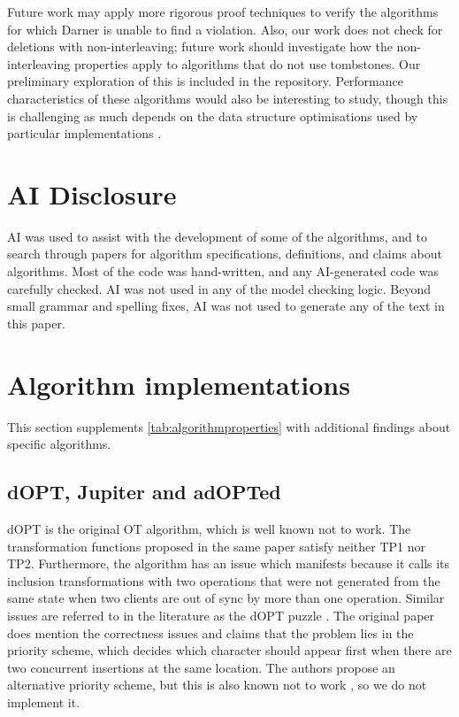 \documentclass[sigplan,10pt,review,anonymous]{acmart}
\begin{document}
Future work may apply more rigorous proof techniques to verify the algorithms for which Darner is unable to find a violation. 
Also, our work does not check for deletions with non-interleaving; future work should investigate how the non-interleaving properties apply to algorithms that do not use tombstones. Our preliminary exploration of this is included in the repository.
Performance characteristics of these algorithms would also be interesting to study, though this is challenging as much depends on the data structure optimisations used by particular implementations \cite{Gentle2025}.



\section*{AI Disclosure}

AI was used to assist with the development of some of the algorithms, and to search through papers for algorithm specifications, definitions, and claims about algorithms. Most of the code was hand-written, and any AI-generated code was carefully checked. AI was not used in any of the model checking logic. Beyond small grammar and spelling fixes, AI was not used to generate any of the text in this paper. 





\clearpage
\appendix

\section{Algorithm implementations} \label{sec:algorithmimplementations}

This section supplements \autoref{tab:algorithmproperties} with additional findings about specific algorithms.

\subsection{dOPT, Jupiter and adOPTed} \label{sec:doptjupiteradoptedimplementation}

dOPT \cite{Ellis1989} is the original OT algorithm, which is well known not to work. The transformation functions proposed in the same paper satisfy neither TP1 nor TP2. Furthermore, the algorithm has an issue which manifests because it calls its inclusion transformations with two operations that were not generated from the same state when two clients are out of sync by more than one operation. Similar issues are referred to in the literature as the dOPT puzzle \cite{Sun1998CSCW}. The original paper does mention the correctness issues and claims that the problem lies in the priority scheme, which decides which character should appear first when there are two concurrent insertions at the same location. The authors propose an alternative priority scheme, but this is also known not to work \cite{Sun1998CSCW}, so we do not implement it.
\end{document}
